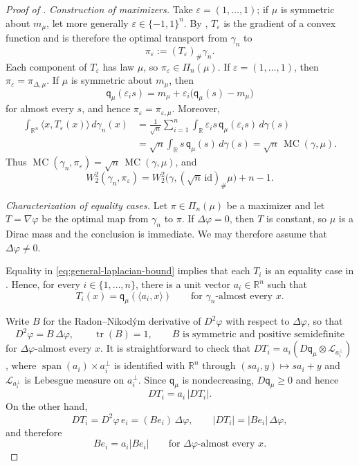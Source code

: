 \documentclass[10pt,a4paper]{amsart}
\newcommand{\MC}{\operatorname{MC}}
\newcommand{\R}{\mathbb{R}}
\newcommand{\W}{W}
\newcommand{\qmu}{\mathsf q_{\mu}}
\begin{document}
\begin{proof}[Proof of ]
\noindent\emph{Construction of maximizers.}
Take $\varepsilon=(1,\ldots,1)$; if $\mu$ is symmetric about
$m_\mu$, let more generally $\varepsilon\in\{-1,1\}^n$. By
, $T_\varepsilon$ is the gradient of a
convex function and is therefore the optimal transport from
$\gamma_n$ to
\[
  \pi_\varepsilon:=(T_\varepsilon)_\#\gamma_n.
\]
Each component of $T_\varepsilon$ has law $\mu$, so
$\pi_\varepsilon\in\Pi_n(\mu)$. If
$\varepsilon=(1,\ldots,1)$, then $\pi_\varepsilon=\pi_{\Delta,\mu}$.
If $\mu$ is symmetric about $m_\mu$, then
\[
  \qmu(\varepsilon_i s)
  =
  m_\mu+\varepsilon_i\bigl(\qmu(s)-m_\mu\bigr)
\]
for almost every $s$, and hence
$\pi_\varepsilon=\pi_{\varepsilon,\mu}$. Moreover,
\begin{align*}
  \int_{\R^n}
  \langle x,T_\varepsilon(x)\rangle\,d\gamma_n(x)
  &=
  \frac1{\sqrt n}\sum_{i=1}^n
  \int_\R \varepsilon_i s\,\qmu(\varepsilon_i s)\,d\gamma(s)\\
  &=
  \sqrt n\int_\R s\,\qmu(s)\,d\gamma(s)
  =
  \sqrt n\,\MC(\gamma,\mu).
\end{align*}
Thus $\MC(\gamma_n,\pi_\varepsilon)
=\sqrt n\,\MC(\gamma,\mu)$, and
\[
  \W_2^2(\gamma_n,\pi_\varepsilon)
  =
  \W_2^2\bigl(\gamma,(\sqrt n\,\mathrm{id})_\#\mu\bigr)+n-1.
\]

\medskip
\noindent\emph{Characterization of equality cases.}
Let $\pi\in\Pi_n(\mu)$ be a maximizer and let $T=\nabla\varphi$
be the optimal map from $\gamma_n$ to $\pi$. If
$\Delta\varphi=0$, then $T$ is constant, so $\mu$ is a Dirac mass
and the conclusion is immediate. We may therefore assume that
$\Delta\varphi\neq0$.

Equality in \eqref{eq:general-laplacian-bound} implies that each
$T_i$ is an equality case in . Hence, for
every $i\in\{1,\ldots,n\}$, there is a unit vector $a_i\in\R^n$
such that
\begin{equation}\label{eq:equality-components}
  T_i(x)=\qmu(\langle a_i,x\rangle)
  \qquad\text{for $\gamma_n$-almost every }x.
\end{equation}

Write $B$ for the Radon--Nikodým derivative of $D^2\varphi$ with
respect to $\Delta\varphi$, so that
\[
  D^2\varphi=B\,\Delta\varphi,
  \qquad
  \operatorname{tr}(B)=1,
  \qquad
  B\text{ is symmetric and positive semidefinite}
\]
for $\Delta\varphi$-almost every $x$. It is straightforward to check that $DT_i = a_i ( D\qmu \otimes \mathcal{L}_{a_i^\bot})$, where $\operatorname{span}(a_i)\times a_i^\bot$ is identified with $\R^n$ through $(s a_i,y)\mapsto s a_i+y$ and $\mathcal{L}_{a_i^\bot}$ is Lebesgue measure on $a_i^\bot$. Since $\qmu$ is nondecreasing, $D \qmu \ge 0$ and hence
\[
  DT_i=a_i\,|DT_i|.
\]
On the other hand,
\[
  DT_i=D^2\varphi\,e_i=(Be_i)\,\Delta\varphi,
  \qquad
  |DT_i|=|Be_i|\,\Delta\varphi,
\]
and therefore
\begin{equation}\label{eq:prf:B_struc}
  Be_i=a_i|Be_i|
  \qquad\text{for $\Delta\varphi$-almost every }x.
\end{equation}


\end{proof}
\end{document}
